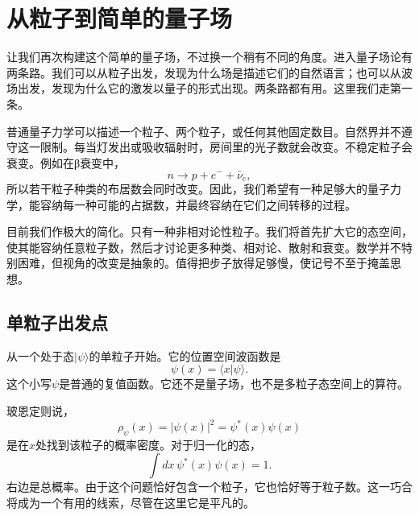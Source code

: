 \chapter{从粒子到简单的量子场}

让我们再次构建这个简单的量子场，不过换一个稍有不同的角度。进入量子场论有两条路。我们可以从粒子出发，发现为什么场是描述它们的自然语言；也可以从波场出发，发现为什么它的激发以量子的形式出现。两条路都有用。这里我们走第一条。

普通量子力学可以描述一个粒子、两个粒子，或任何其他固定数目。自然界并不遵守这一限制。每当灯发出或吸收辐射时，房间里的光子数就会改变。不稳定粒子会衰变。例如在{\proseunicodefont β}衰变中，
\begin{equation}
n\longrightarrow p+e^-+\bar{\nu}_e,
\end{equation}
所以若干粒子种类的布居数会同时改变。因此，我们希望有一种足够大的量子力学，能容纳每一种可能的占据数，并最终容纳在它们之间转移的过程。

目前我们作极大的简化。只有一种非相对论性粒子。我们将首先扩大它的态空间，使其能容纳任意粒子数，然后才讨论更多种类、相对论、散射和衰变。数学并不特别困难，但视角的改变是抽象的。值得把步子放得足够慢，使记号不至于掩盖思想。

\section{单粒子出发点}

从一个处于态\(|\psi\rangle\)的单粒子开始。它的位置空间波函数是
\begin{equation}
\psi(x)=\langle x|\psi\rangle.
\label{eq:l07-wavefunction}
\end{equation}
这个小写\(\psi\)是普通的复值函数。它还不是量子场，也不是多粒子态空间上的算符。

玻恩定则说，
\begin{equation}
\rho_\psi(x)=|\psi(x)|^2=\psi^*(x)\psi(x)
\label{eq:l07-born-density}
\end{equation}
是在\(x\)处找到该粒子的概率密度。对于归一化的态，
\begin{equation}
\int dx\,\psi^*(x)\psi(x)=1.
\label{eq:l07-one-particle-normalization}
\end{equation}
右边是总概率。由于这个问题恰好包含一个粒子，它也恰好等于粒子数。这一巧合将成为一个有用的线索，尽管在这里它是平凡的。

\begin{classroomqa}
\end{classroomqa}

